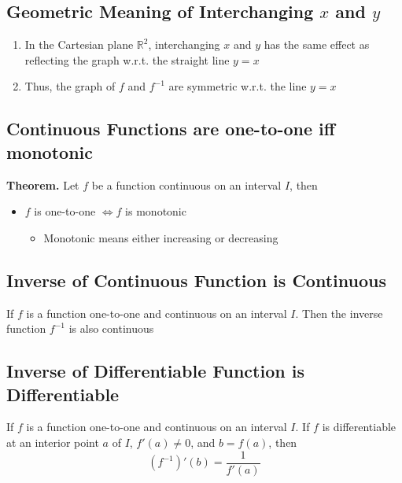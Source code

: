 \documentclass[../ma2002_notes.tex]{subfiles}
\begin{document}
\subsection{Geometric Meaning of Interchanging $x$ and $y$}
\begin{enumerate}
	\item In the Cartesian plane \(\mathbb{R}^2\), interchanging \(x\) and \(y\) has the same effect as reflecting the graph w.r.t. the straight line \(y=x\)
	\item Thus, the graph of \(f\) and \(f^{-1}\) are symmetric w.r.t. the line \(y=x\)
\end{enumerate}

\subsection{Continuous Functions are one-to-one iff monotonic}
\textbf{Theorem.} Let \(f\) be a function continuous on an interval \(I\), then
\begin{itemize}
	\item\(f\) is one-to-one \(\iff f\) is monotonic
	\begin{itemize}
		\item Monotonic means either increasing or decreasing
	\end{itemize}
\end{itemize}

\subsection{Inverse of Continuous Function is Continuous}
If \(f\) is a function one-to-one and continuous on an interval \(I\). Then the inverse function \(f^{-1}\) is also continuous

\subsection{Inverse of Differentiable Function is Differentiable}
If \(f\) is a function one-to-one and continuous on an interval \(I\). If \(f\) is differentiable at an interior point \(a\) of \(I\), \(f'(a)\ne0\), and \(b=f(a)\), then
\[(f^{-1})'(b)=\frac{1}{f'(a)}\]
\end{document}
